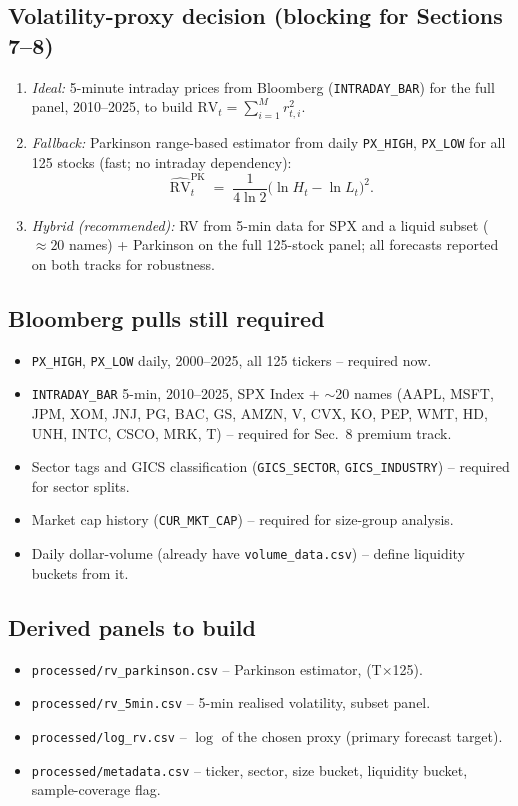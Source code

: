 \documentclass[11pt,a4paper]{article}
\begin{document}
\subsection{Volatility-proxy decision (blocking for Sections 7--8)}
\begin{enumerate}
  \item \emph{Ideal:} 5-minute intraday prices from Bloomberg
  (\texttt{INTRADAY\_BAR}) for the full panel, 2010--2025, to build
  $\mathrm{RV}_t=\sum_{i=1}^{M}r_{t,i}^2$.
  \item \emph{Fallback:} Parkinson range-based estimator from daily
  \texttt{PX\_HIGH}, \texttt{PX\_LOW} for all 125 stocks (fast; no intraday
  dependency):
  \[
    \widehat{\mathrm{RV}}^{\mathrm{PK}}_t \;=\;
    \frac{1}{4\ln 2}\bigl(\ln H_t-\ln L_t\bigr)^2.
  \]
  \item \emph{Hybrid (recommended):} RV from 5-min data for SPX and a liquid
  subset ($\approx 20$ names) + Parkinson on the full 125-stock panel;
  all forecasts reported on both tracks for robustness.
\end{enumerate}

\subsection{Bloomberg pulls still required}
\begin{itemize}
  \item \texttt{PX\_HIGH}, \texttt{PX\_LOW} daily, 2000--2025, all 125
  tickers -- required now.
  \item \texttt{INTRADAY\_BAR} 5-min, 2010--2025, SPX Index + $\sim$20 names
  (AAPL, MSFT, JPM, XOM, JNJ, PG, BAC, GS, AMZN, V, CVX, KO, PEP, WMT, HD,
  UNH, INTC, CSCO, MRK, T) -- required for Sec.~8 premium track.
  \item Sector tags and GICS classification (\texttt{GICS\_SECTOR},
  \texttt{GICS\_INDUSTRY}) -- required for sector splits.
  \item Market cap history (\texttt{CUR\_MKT\_CAP}) -- required for
  size-group analysis.
  \item Daily dollar-volume (already have \texttt{volume\_data.csv}) --
  define liquidity buckets from it.
\end{itemize}

\subsection{Derived panels to build}
\begin{itemize}
  \item \texttt{processed/rv\_parkinson.csv} -- Parkinson estimator, (T$\times$125).
  \item \texttt{processed/rv\_5min.csv} -- 5-min realised volatility,
  subset panel.
  \item \texttt{processed/log\_rv.csv} -- $\log$ of the chosen proxy
  (primary forecast target).
  \item \texttt{processed/metadata.csv} -- ticker, sector, size bucket,
  liquidity bucket, sample-coverage flag.
\end{itemize}
\end{document}
